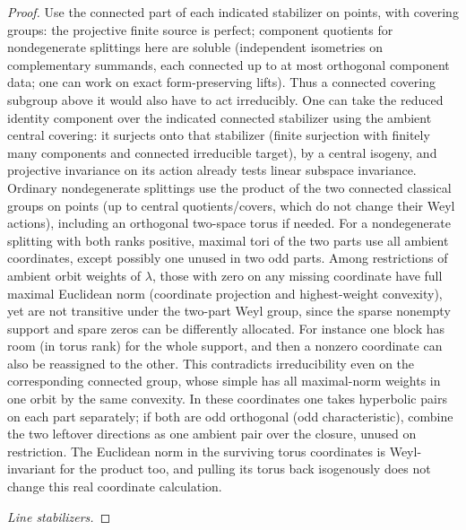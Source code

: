 \begin{proof}
Use the connected part of each indicated stabilizer on points, with covering groups: the projective finite source is perfect; component quotients for nondegenerate splittings here are soluble (independent isometries on complementary summands, each connected up to at most orthogonal component data; one can work on exact form-preserving lifts). Thus a connected covering subgroup above it would also have to act irreducibly. One can take the reduced identity component over the indicated connected stabilizer using the ambient central covering: it surjects onto that stabilizer (finite surjection with finitely many components and connected irreducible target), by a central isogeny, and projective invariance on its action already tests linear subspace invariance. Ordinary nondegenerate splittings use the product of the two connected classical groups on points (up to central quotients/covers, which do not change their Weyl actions), including an orthogonal two-space torus if needed. For a nondegenerate splitting with both ranks positive, maximal tori of the two parts use all ambient coordinates, except possibly one unused in two odd parts. Among restrictions of ambient orbit weights of \(\lambda\), those with zero on any missing coordinate have full maximal Euclidean norm (coordinate projection and highest-weight convexity), yet are not transitive under the two-part Weyl group, since the sparse nonempty support and spare zeros can be differently allocated. For instance one block has room (in torus rank) for the whole support, and then a nonzero coordinate can also be reassigned to the other. This contradicts irreducibility even on the corresponding connected group, whose simple has all maximal-norm weights in one orbit by the same convexity. In these coordinates one takes hyperbolic pairs on each part separately; if both are odd orthogonal (odd characteristic), combine the two leftover directions as one ambient pair over the closure, unused on restriction. The Euclidean norm in the surviving torus coordinates is Weyl-invariant for the product too, and pulling its torus back isogenously does not change this real coordinate calculation.

\noindent\emph{Line stabilizers.}


\end{proof}

